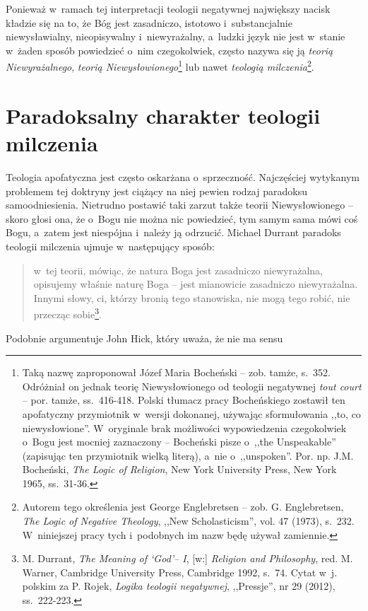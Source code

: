 Ponieważ w~ramach tej interpretacji teologii negatywnej największy nacisk kładzie się na to, że Bóg jest zasadniczo, istotowo i~substancjalnie niewysławialny, nieopisywalny i~niewyrażalny, a~ludzki język nie jest w~stanie w~żaden sposób powiedzieć o~nim czegokolwiek, często nazywa się ją \textit{teorią Niewyrażalnego}, \textit{teorią Niewysłowionego}\footnote{Taką nazwę zaproponował Józef Maria Bocheński -- zob. tamże, s.~352. Odróżniał on jednak teorię Niewysłowionego od teologii negatywnej \textit{tout court} -- por. tamże, ss.~416-418. Polski tłumacz pracy Bocheńskiego zostawił ten apofatyczny przymiotnik w~wersji dokonanej, używając sformułowania ,,to, co niewysłowione''. W~oryginale brak możliwości wypowiedzenia czegokolwiek o~Bogu jest mocniej zaznaczony -- Bocheński pisze o~,,the Unspeakable'' (zapisując ten przymiotnik wielką literą), a~nie o~,,unspoken''. Por. np. J.M. Bocheński, \textit{The Logic of Religion}, New York University Press, New York 1965, ss.~31-36.} lub nawet \textit{teologią milczenia}\footnote{Autorem tego określenia jest George Englebretsen -- zob. G. Englebretsen, \textit{The Logic of Negative Theology}, ,,New Scholasticism'', vol. 47 (1973), s.~232. W~niniejszej pracy
tych i~podobnych im
nazw będę używał zamiennie.
}.


\section{Paradoksalny charakter teologii milczenia}\label{sil-int-par}

Teologia apofatyczna jest często oskarżana o~sprzeczność. Najczęściej wytykanym problemem tej doktryny jest ciążący na niej pewien rodzaj paradoksu samoodniesienia. Nietrudno postawić taki zarzut także teorii Niewysłowionego -- skoro głosi ona, że o~Bogu nie można nic powiedzieć, tym samym sama mówi coś Bogu, a~zatem jest niespójna i~należy ją odrzucić. Michael Durrant paradoks teologii milczenia ujmuje w~następujący sposób:

\begin{quote}
w~tej teorii, mówiąc, że natura Boga jest zasadniczo niewyrażalna, opisujemy właśnie naturę Boga -- jest mianowicie zasadniczo niewyrażalna. Innymi słowy, ci, którzy bronią tego stanowiska, nie mogą tego robić, nie przecząc sobie\footnote{M. Durrant, \textit{The Meaning of ‘God'– I}, [w:] \textit{Religion and Philosophy}, red. M. Warner, Cambridge University Press, Cambridge 1992, s.~74. Cytat w~j. polskim za P. Rojek, \textit{Logika teologii negatywnej}, ,,Pressje'', nr 29 (2012), ss.~222-223.}.

\end{quote}
Podobnie argumentuje John Hick, który uważa, że nie ma sensu

